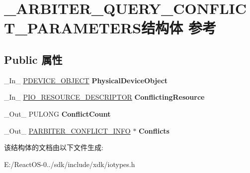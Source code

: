 \hypertarget{struct___a_r_b_i_t_e_r___q_u_e_r_y___c_o_n_f_l_i_c_t___p_a_r_a_m_e_t_e_r_s}{}\section{\+\_\+\+A\+R\+B\+I\+T\+E\+R\+\_\+\+Q\+U\+E\+R\+Y\+\_\+\+C\+O\+N\+F\+L\+I\+C\+T\+\_\+\+P\+A\+R\+A\+M\+E\+T\+E\+R\+S结构体 参考}
\label{struct___a_r_b_i_t_e_r___q_u_e_r_y___c_o_n_f_l_i_c_t___p_a_r_a_m_e_t_e_r_s}
\subsection*{Public 属性}
\begin{DoxyCompactItemize}
\item 
\mbox{\label{struct___a_r_b_i_t_e_r___q_u_e_r_y___c_o_n_f_l_i_c_t___p_a_r_a_m_e_t_e_r_s_a58bcd7f795624fd09681720182cbaa7a}} 
\+\_\+\+In\+\_\+ \hyperlink{struct___d_e_v_i_c_e___o_b_j_e_c_t}{P\+D\+E\+V\+I\+C\+E\+\_\+\+O\+B\+J\+E\+CT} {\bfseries Physical\+Device\+Object}
\item 
\mbox{\label{struct___a_r_b_i_t_e_r___q_u_e_r_y___c_o_n_f_l_i_c_t___p_a_r_a_m_e_t_e_r_s_ae0461dc1fc3c08779abbbccada174325}} 
\+\_\+\+In\+\_\+ \hyperlink{struct___i_o___r_e_s_o_u_r_c_e___d_e_s_c_r_i_p_t_o_r}{P\+I\+O\+\_\+\+R\+E\+S\+O\+U\+R\+C\+E\+\_\+\+D\+E\+S\+C\+R\+I\+P\+T\+OR} {\bfseries Conflicting\+Resource}
\item 
\mbox{\label{struct___a_r_b_i_t_e_r___q_u_e_r_y___c_o_n_f_l_i_c_t___p_a_r_a_m_e_t_e_r_s_a1d4a90816f5c9f16c418a767b5e535ee}} 
\+\_\+\+Out\+\_\+ P\+U\+L\+O\+NG {\bfseries Conflict\+Count}
\item 
\mbox{\label{struct___a_r_b_i_t_e_r___q_u_e_r_y___c_o_n_f_l_i_c_t___p_a_r_a_m_e_t_e_r_s_ae9159b69962cf28bc95991cbef0349ca}} 
\+\_\+\+Out\+\_\+ \hyperlink{struct___a_r_b_i_t_e_r___c_o_n_f_l_i_c_t___i_n_f_o}{P\+A\+R\+B\+I\+T\+E\+R\+\_\+\+C\+O\+N\+F\+L\+I\+C\+T\+\_\+\+I\+N\+FO} $\ast$ {\bfseries Conflicts}
\end{DoxyCompactItemize}


该结构体的文档由以下文件生成\+:\begin{DoxyCompactItemize}
\item 
E\+:/\+React\+O\+S-\/0../sdk/include/xdk/iotypes.\+h\end{DoxyCompactItemize}
